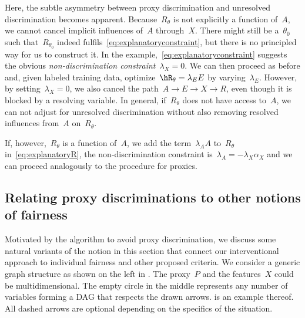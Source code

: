 Here, the subtle asymmetry between proxy discrimination and unresolved
discrimination becomes apparent. Because~$R_{\theta}$ is not explicitly a
function of~$A$, we cannot cancel implicit influences of~$A$ through~$X$. There
might still be a~$\theta_0$ such that~$R_{\theta_0}$ indeed
fulfils~\eqref{eq:explanatoryconstraint}, but there is no principled way for us
to construct it. In the example,~\eqref{eq:explanatoryconstraint} suggests the
obvious \emph{non-discrimination constraint}~$\lambda_X = 0$. We can then
proceed as before and, given labeled training data, optimize~$\hR_{\theta} =
\lambda_E E$ by varying~$\lambda_E$. However, by setting~$\lambda_X = 0$, we
also cancel the path~$A \to E \to X \to R$, even though it is blocked by a
resolving variable.  In general, if~$R_{\theta}$ does not have access to~$A$, we
can not adjust for unresolved discrimination without also removing resolved
influences from~$A$ on~$R_{\theta}$.

If, however,~$R_{\theta}$ is a function of~$A$, \ie{} we add the term~$\lambda_A
A$ to~$R_{\theta}$ in~\eqref{eq:explanatoryR}, the non-discrimination constraint
is~$\lambda_A = - \lambda_X \alpha_X$ and we can proceed analogously to the
procedure for proxies.

\subsection{Relating proxy discriminations to other notions of fairness}
\label{sec:variants}

Motivated by the algorithm to avoid proxy discrimination, we discuss some
natural variants of the notion in this section that connect our interventional
approach to individual fairness and other proposed criteria. We consider a
generic graph structure as shown on the left in . The
proxy~$P$ and the features~$X$ could be multidimensional. The empty circle in
the middle represents any number of variables forming a DAG that respects the
drawn arrows.   is an example thereof. All dashed
arrows are optional depending on the specifics of the situation.

